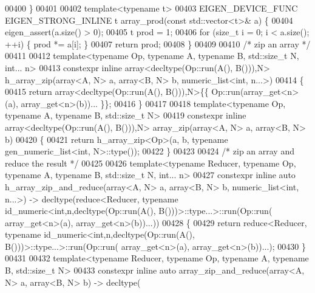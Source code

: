 \begin{DoxyCode}
00400 \}
00401 
00402 \textcolor{keyword}{template}<\textcolor{keyword}{typename} t>
00403 EIGEN\_DEVICE\_FUNC EIGEN\_STRONG\_INLINE t array\_prod(\textcolor{keyword}{const} std::vector<t>& a) \{
00404   eigen\_assert(a.size() > 0);
00405   t prod = 1;
00406   \textcolor{keywordflow}{for} (\textcolor{keywordtype}{size\_t} i = 0; i < a.size(); ++i) \{ prod *= a[i]; \}
00407   \textcolor{keywordflow}{return} prod;
00408 \}
00409 
00410 \textcolor{comment}{/* zip an array */}
00411 
00412 \textcolor{keyword}{template}<\textcolor{keyword}{typename} Op, \textcolor{keyword}{typename} A, \textcolor{keyword}{typename} B, std::size\_t N, \textcolor{keywordtype}{int}... n>
00413 constexpr \textcolor{keyword}{inline} array<decltype(Op::run(A(), B())),N> h\_array\_zip(array<A, N> a, array<B, N> b, 
      numeric\_list<int, n...>)
00414 \{
00415   \textcolor{keywordflow}{return} array<decltype(Op::run(A(), B())),N>\{\{ Op::run(array\_get<n>(a), array\_get<n>(b))... \}\};
00416 \}
00417 
00418 \textcolor{keyword}{template}<\textcolor{keyword}{typename} Op, \textcolor{keyword}{typename} A, \textcolor{keyword}{typename} B, std::\textcolor{keywordtype}{size\_t} N>
00419 constexpr \textcolor{keyword}{inline} array<decltype(Op::run(A(), B())),N> array\_zip(array<A, N> a, array<B, N> b)
00420 \{
00421   \textcolor{keywordflow}{return} h\_array\_zip<Op>(a, b, \textcolor{keyword}{typename} gen\_numeric\_list<int, N>::type());
00422 \}
00423 
00424 \textcolor{comment}{/* zip an array and reduce the result */}
00425 
00426 \textcolor{keyword}{template}<\textcolor{keyword}{typename} Reducer, \textcolor{keyword}{typename} Op, \textcolor{keyword}{typename} A, \textcolor{keyword}{typename} B, std::size\_t N, \textcolor{keywordtype}{int}... n>
00427 constexpr \textcolor{keyword}{inline} \textcolor{keyword}{auto} h\_array\_zip\_and\_reduce(array<A, N> a, array<B, N> b, numeric\_list<int, n...>) -> 
      decltype(reduce<Reducer, \textcolor{keyword}{typename} id\_numeric<\textcolor{keywordtype}{int},n,decltype(Op::run(A(), B()))>::type...>::run(Op::run(
      array\_get<n>(a), array\_get<n>(b))...))
00428 \{
00429   \textcolor{keywordflow}{return} reduce<Reducer, typename id\_numeric<int,n,decltype(Op::run(A(), B()))>::type...>::run(Op::run(
      array\_get<n>(a), array\_get<n>(b))...);
00430 \}
00431 
00432 \textcolor{keyword}{template}<\textcolor{keyword}{typename} Reducer, \textcolor{keyword}{typename} Op, \textcolor{keyword}{typename} A, \textcolor{keyword}{typename} B, std::\textcolor{keywordtype}{size\_t} N>
00433 constexpr \textcolor{keyword}{inline} \textcolor{keyword}{auto} array\_zip\_and\_reduce(array<A, N> a, array<B, N> b) -> decltype(

\end{DoxyCode}
